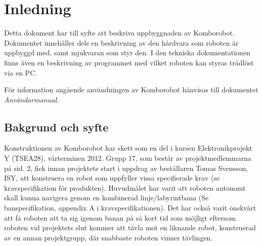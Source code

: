 
%
%


\section{Inledning}
Detta dokument har till syfte att beskriva uppbyggnaden av Komborobot.
Dokumentet innehåller dels en beskrivning av den hårdvara som roboten är 
uppbyggd med, samt mjukvaran som styr den. I den tekniska dokumentationen 
finns även en beskrivning av programmet med vilket roboten kan styras 
trådlöst via en PC. 

För information angående användningen av Komborobot hänvisas till dokumentet 
\emph{Användarmanual}. 

\subsection{Bakgrund och syfte}
Konstruktionen av Komborobot har skett som en del i kursen Elektronikprojekt 
Y (TSEA28), vårterminen 2012. Grupp 17, som består av projektmedlemmarna på 
sid. 2, fick innan projektets start i uppdrag av beställaren Tomas Svensson, 
ISY, att konstruera en robot som uppfyller vissa specifierade krav (se 
kravspecifikation för produkten). Huvudmålet har varit att roboten autonomt 
skall kunna navigera genom en kombinerad linje/labyrintbana (Se 
banspecifikation, appendix A i kravspecifikationen).  Det har också varit 
önskvärt att få roboten att ta sig igenom banan på så kort tid som möjligt 
eftersom roboten vid projektets slut kommer att tävla mot en liknande robot, 
konstruerad av en annan projektgrupp, där snabbaste roboten vinner tävlingen.
